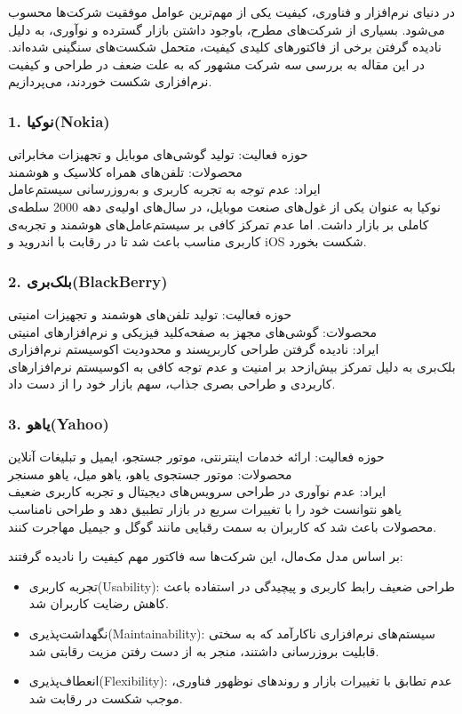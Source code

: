 

در دنیای نرم‌افزار و فناوری، کیفیت یکی از مهم‌ترین عوامل موفقیت شرکت‌ها محسوب می‌شود. بسیاری از شرکت‌های مطرح، باوجود داشتن بازار گسترده و نوآوری، به دلیل نادیده گرفتن برخی از فاکتورهای کلیدی کیفیت، متحمل شکست‌های سنگینی شده‌اند. در این مقاله به بررسی سه شرکت مشهور که به علت ضعف در طراحی و کیفیت نرم‌افزاری شکست خوردند، می‌پردازیم.


\subsubsection*{1. نوکیا(Nokia)}
{حوزه فعالیت:} تولید گوشی‌های موبایل و تجهیزات مخابراتی\\
{محصولات:} تلفن‌های همراه کلاسیک و هوشمند\\
{ایراد:} عدم توجه به تجربه کاربری و به‌روز‌رسانی سیستم‌عامل\\
نوکیا به عنوان یکی از غول‌های صنعت موبایل، در سال‌های اولیه‌ی دهه 2000 سلطه‌ی کاملی بر بازار داشت. اما عدم تمرکز کافی بر سیستم‌عامل‌های هوشمند و تجربه‌ی کاربری مناسب باعث شد تا در رقابت با اندروید و iOS شکست بخورد.

\subsubsection*{2. بلک‌بری(BlackBerry)}
{حوزه فعالیت:} تولید تلفن‌های هوشمند و تجهیزات امنیتی\\
{محصولات:} گوشی‌های مجهز به صفحه‌کلید فیزیکی و نرم‌افزارهای امنیتی\\
{ایراد:} نادیده گرفتن طراحی کاربرپسند و محدودیت اکوسیستم نرم‌افزاری\\
بلک‌بری به دلیل تمرکز بیش‌ازحد بر امنیت و عدم توجه کافی به اکوسیستم نرم‌افزارهای کاربردی و طراحی بصری جذاب، سهم بازار خود را از دست داد.

\subsubsection*{3. یاهو(Yahoo)}
{حوزه فعالیت:} ارائه خدمات اینترنتی، موتور جستجو، ایمیل و تبلیغات آنلاین\\
{محصولات:} موتور جستجوی یاهو، یاهو میل، یاهو مسنجر\\
{ایراد:} عدم نوآوری در طراحی سرویس‌های دیجیتال و تجربه کاربری ضعیف\\
یاهو نتوانست خود را با تغییرات سریع در بازار تطبیق دهد و طراحی نامناسب محصولات باعث شد که کاربران به سمت رقبایی مانند گوگل و جیمیل مهاجرت کنند.

بر اساس مدل مک‌مال، این شرکت‌ها سه فاکتور مهم کیفیت را نادیده گرفتند:
\begin{itemize}
    \item {تجربه کاربری(Usability):} طراحی ضعیف رابط کاربری و پیچیدگی در استفاده باعث کاهش رضایت کاربران شد.
    \item {نگهداشت‌پذیری(Maintainability):} سیستم‌های نرم‌افزاری ناکارآمد که به سختی قابلیت بروزرسانی داشتند، منجر به از دست رفتن مزیت رقابتی شد.
    \item {انعطاف‌پذیری(Flexibility):} عدم تطابق با تغییرات بازار و روندهای نوظهور فناوری، موجب شکست در رقابت شد.
\end{itemize}


